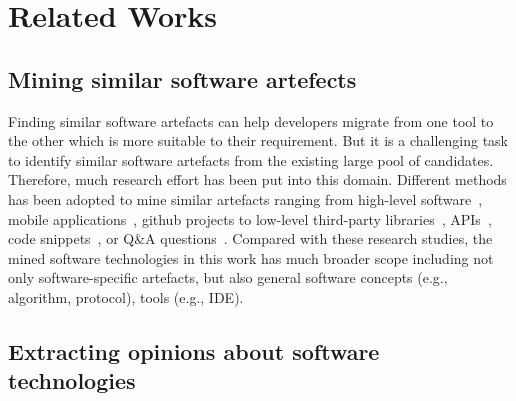 \section{Related Works}
\subsection{Mining similar software artefects}
Finding similar software artefacts can help developers migrate from one tool to the other which is more suitable to their requirement.
But it is a challenging task to identify similar software artefacts from the existing large pool of candidates.
Therefore, much research effort has been put into this domain.
Different methods has been adopted to mine similar artefacts ranging from high-level software~\cite{mcmillan2012detecting, thung2012detecting}, mobile applications~\cite{chen2015simapp, linares2016automatically}, github projects\cite{zhang2017detecting} to low-level third-party libraries~\cite{teyton2013automatic, chen2016mining, chen2016similartech}, APIs~\cite{gu2017deepam, nguyen2017exploring}, code snippets~\cite{su2016identifying}, or Q\&A questions~\cite{chen2016learning}.
Compared with these research studies, the mined software technologies in this work has much broader scope including not only software-specific artefacts, but also general software concepts (e.g., algorithm, protocol),  tools (e.g., IDE).

\subsection{Extracting opinions about software technologies}

